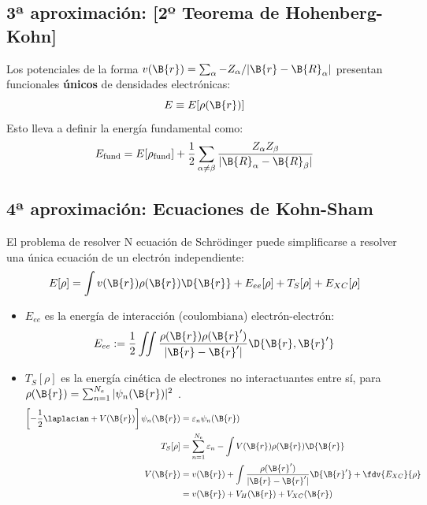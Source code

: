 \subsection{3ª aproximación: [2º Teorema de Hohenberg-Kohn]}
Los potenciales de la forma $v(\B{r})=\sum_\alpha -Z_\alpha /|\B{r}-\B{R}_\alpha |$ presentan funcionales \textbf{únicos} de densidades electrónicas:
\begin{equation}
    E\equiv E[\rho(\B{r})]
\end{equation}
Esto lleva a definir la energía fundamental como:
\begin{equation}
    E_\text{fund} = E[\rho_\text{fund}] + \frac{1}{2} \sum _{\alpha \neq \beta } \frac{Z_\alpha Z_\beta }{|\B{R}_\alpha - \B{R}_\beta |}
\end{equation}
\subsection{4ª aproximación: Ecuaciones de Kohn-Sham}
El problema de resolver N ecuación de Schrödinger puede simplificarse a resolver una única ecuación de un electrón independiente:
\begin{equation}
    E[\rho] = \int v(\B{r}) \rho (\B{r}) \D{\B{r}} + E_{ee}[\rho] + T_S [\rho] + E_{XC} [\rho]
\end{equation}
\begin{itemize}
    \item $E_{ee}$ es la energía de interacción (coulombiana) electrón-electrón:
    $$
    E_{ee} := \frac{1}{2} \iint \frac{\rho(\B{r}) \rho(\B{r}')}{|\B{r} - \B{r}'|} \D{\B{r},\B{r}'}
    $$

    \item $T_S[\rho] $ es la energía cinética de electrones no interactuantes entre sí, para $\rho(\B{r}) = \sum_{n=1} ^{N_e} |\psi_n(\B{r})|^2$ . 
    \begin{equation*}
        \begin{split}
                \left [ -\frac{1}{2}\laplacian + V(\B{r}) \right ] \psi_n (\B{r}) &= \varepsilon_n \psi_n (\B{r})\\
                                                                        T_S[\rho] &= \sum_{n=1} ^{N_e} \varepsilon_n - \int V(\B{r}) \rho (\B{r}) \D{\B{r}}                                \\
                                                                         V(\B{r}) &= v(\B{r}) + \int \frac{\rho(\B{r}')}{|\B{r}-\B{r}'|} \D{\B{r}'} + \fdv{E_{XC}}{\rho }\\
                                                                                  &= v(\B{r}) + V_H(\B{r}) + V_{XC}(\B{r})
        \end{split}
    \end{equation*}
\end{itemize}
